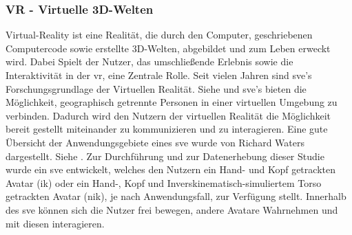 \documentclass[a4paper,11pt]{article}%
\renewcommand{\\}{\vspace*{0.5\baselineskip} \newline}
\begin{document}
		\subsubsection{VR - Virtuelle 3D-Welten}
Virtual-Reality ist eine Realität, die durch den Computer, geschriebenen Computercode sowie erstellte 3D-Welten, abgebildet und zum Leben erweckt wird. Dabei Spielt der Nutzer, das umschließende Erlebnis sowie die Interaktivität in der \ac{vr}, eine Zentrale Rolle. \citep[p.6-12]{sherman2018understanding}
	Seit vielen Jahren sind \ac{sve}'s Forschungsgrundlage der Virtuellen Realität. Siehe \citep{shuffler2011there} \citep{steed1999leadership} und \citep{de2011level} \\
	\ac{sve}'s bieten die Möglichkeit, geographisch getrennte Personen in einer virtuellen Umgebung zu verbinden. Dadurch wird den Nutzern der virtuellen Realität die Möglichkeit bereit gestellt miteinander zu kommunizieren und zu interagieren. \citep[p. 1-3]{pettifer1999designing} Eine gute Übersicht der Anwendungsgebiete eines \ac{sve} wurde von Richard Waters dargestellt. Siehe \citep{waters1997rise}.
	Zur Durchführung und zur Datenerhebung dieser Studie wurde ein \ac{sve} entwickelt, welches den Nutzern ein \dq{}Hand- und Kopf getrackten Avatar\dq{} (\ac{ik}) oder ein \dq{}Hand-, Kopf und Inverskinematisch-simuliertem Torso getrackten Avatar\dq{} (\ac{nik}), je nach Anwendungsfall, zur Verfügung stellt. Innerhalb des \ac{sve} können sich die Nutzer frei bewegen, andere Avatare Wahrnehmen und mit diesen interagieren.
	
	
\end{document}
